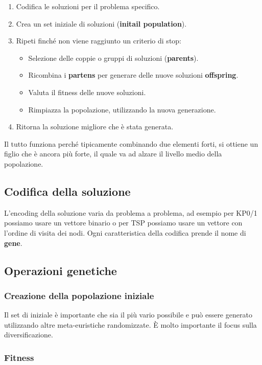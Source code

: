 \begin{enumerate}
	\item Codifica le soluzioni per il problema specifico.
	\item Crea un set iniziale di soluzioni (\textbf{initail population}).
	\item Ripeti finché non viene raggiunto un criterio di stop:
	\begin{itemize}
		\item Selezione delle coppie o gruppi di soluzioni (\textbf{parents}).
		\item Ricombina i \textbf{partens} per generare delle nuove soluzioni \textbf{offspring}.
		\item Valuta il fitness delle nuove soluzioni.
		\item Rimpiazza la popolazione, utilizzando la nuova generazione. 
	\end{itemize}
	\item Ritorna la soluzione migliore che è stata generata.
\end{enumerate}

\noindent Il tutto funziona perché tipicamente combinando due elementi forti, si ottiene un figlio che è ancora più forte, il quale va ad alzare il livello medio della popolazione.

\subsection{Codifica della soluzione}

L'encoding della soluzione varia da problema a problema, ad esempio per KP0/1 possiamo usare un vettore binario o per TSP possiamo usare un vettore con l'ordine di visita dei nodi. Ogni caratteristica della codifica prende il nome di \textbf{gene}.

\subsection{Operazioni genetiche}

\subsubsection{Creazione della popolazione iniziale}

Il set di iniziale è importante che sia il più vario possibile e può essere generato utilizzando altre meta-euristiche randomizzate. \`E molto importante il focus sulla diversificazione.

\subsubsection{Fitness}

